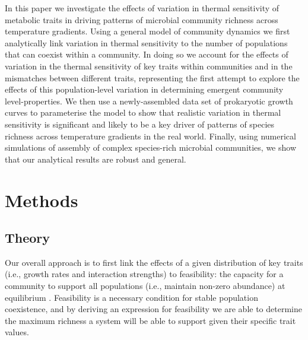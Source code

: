 \documentclass{article}
\begin{document}
In this paper we investigate the effects of variation in thermal sensitivity of metabolic traits in driving patterns of microbial community richness across temperature gradients. Using a general model of community dynamics we first analytically link variation in thermal sensitivity to the number of populations that can coexist within a community. In doing so we account for the effects of variation in the thermal sensitivity of key traits within communities and in the mismatches between different traits, representing the first attempt to explore the effects of this population-level variation in determining emergent community level-properties. We then use a newly-assembled data set of prokaryotic growth curves to parameterise the model to show that realistic variation in thermal sensitivity is significant and likely to be a key driver of patterns of species richness across temperature gradients in the real world. Finally, using numerical simulations of assembly of complex species-rich microbial communities, we show that our analytical results are robust and general. 

\section*{Methods} \label{Methods}

\subsection*{Theory}

Our overall approach is to first link the effects of a given distribution of key traits (i.e., growth rates and interaction strengths) to feasibility: the capacity for a community to support all populations (i.e., maintain non-zero abundance) at equilibrium  \citep{Grilli2017,Dougoud2018}. Feasibility is a necessary condition for stable population coexistence, and by deriving an expression for feasibility we are able to determine the maximum richness a system will be able to support given their specific trait values. 
\end{document}
